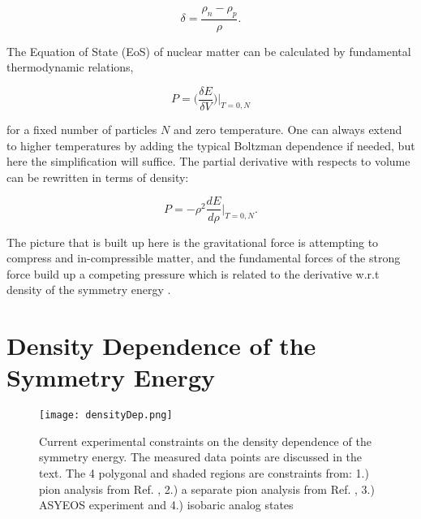 \begin{equation}
\delta = \frac{\rho_n - \rho_p}{\rho}.
\label{eq:asym}
\end{equation}

The Equation of State (EoS) of nuclear matter can be calculated by fundamental thermodynamic relations, 

\begin{equation}
P = \Big(\frac{\delta E}{\delta V}\Big)\vert_{T=0,N}
\label{eq:pressEos}
\end{equation}

for a fixed number of particles $N$ and zero temperature. One can always extend to higher temperatures by adding the typical Boltzman dependence if needed, but here the simplification will suffice. The partial derivative with respects to volume can be rewritten in terms of density:

\begin{equation}
P = -\rho^2 \frac{dE}{d\rho}\vert_{T=0,N}.
\label{eq:densEos}
\end{equation}

The picture that is built up here is the gravitational force is attempting to compress and in-compressible matter, and the fundamental forces of the strong force build up a competing pressure which is related to the derivative w.r.t density of the symmetry energy \cite{tovEq}.  

\section{Density Dependence of the Symmetry Energy}

\begin{figure}[!htb]
\centering
\texttt{[image: densityDep.png]}
\caption{Current experimental constraints on the density dependence of the symmetry energy. The measured data points are discussed in the text. The 4 polygonal and shaded regions are constraints from: 1.) pion analysis from Ref. \cite{xia2009,xie2013}, 2.) a separate pion analysis from Ref. \cite{feng2010}, 3.) ASYEOS experiment \cite{russo2011, russo2016, cozma2013} and 4.) isobaric analog states \cite{dan2014} }
\label{fig:symDen}
\end{figure}


